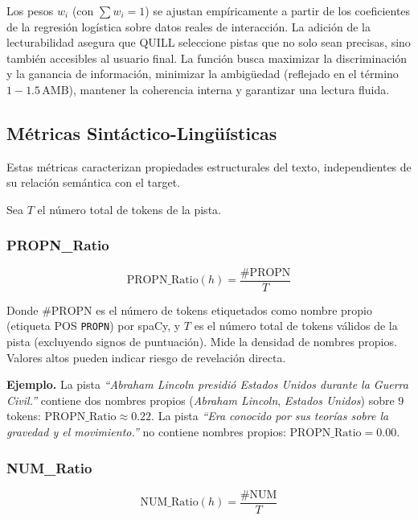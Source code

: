 \documentclass[../main.tex]{subfiles}
\begin{document}
Los pesos $w_i$ (con $\sum w_i = 1$) se ajustan empíricamente a partir de los coeficientes de la regresión logística sobre datos reales de interacción. La adición de la lecturabilidad asegura que QUILL seleccione pistas que no solo sean precisas, sino también accesibles al usuario final. La función busca maximizar la discriminación y la ganancia de información, minimizar la ambigüedad (reflejado en el término $1-1.5\,\text{AMB}$), mantener la coherencia interna y garantizar una lectura fluida.
\subsection{Métricas Sintáctico-Lingüísticas}

Estas métricas caracterizan propiedades estructurales del texto, independientes de su relación semántica con el target.

Sea $T$ el número total de tokens de la pista.

\subsubsection{PROPN\_Ratio}

\begin{equation}
\text{PROPN\_Ratio}(h) =
\frac{\#\text{PROPN}}{T}
\end{equation}

Donde $\#\text{PROPN}$ es el número de tokens etiquetados como nombre propio (etiqueta POS \texttt{PROPN}) por spaCy, y $T$ es el número total de tokens válidos de la pista (excluyendo signos de puntuación). Mide la densidad de nombres propios. Valores altos pueden indicar riesgo de revelación directa.

\medskip
\textbf{Ejemplo.} La pista \textit{``Abraham Lincoln presidió Estados Unidos durante la Guerra Civil.''} contiene dos nombres propios (\textit{Abraham Lincoln}, \textit{Estados Unidos}) sobre 9 tokens: $\text{PROPN\_Ratio} \approx 0.22$. La pista \textit{``Era conocido por sus teorías sobre la gravedad y el movimiento.''} no contiene nombres propios: $\text{PROPN\_Ratio} = 0.00$.

\subsubsection{NUM\_Ratio}

\begin{equation}
\text{NUM\_Ratio}(h) =
\frac{\#\text{NUM}}{T}
\end{equation}
\end{document}
